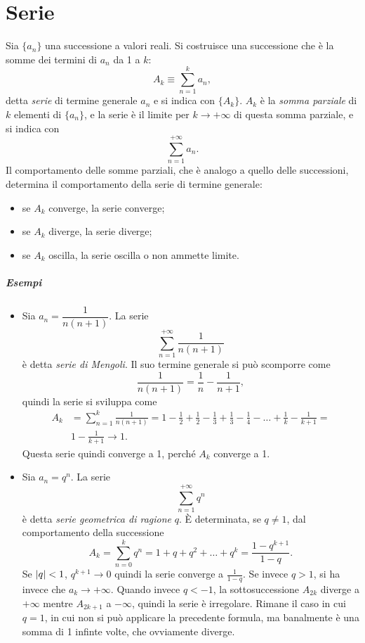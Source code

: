 \chapter{Serie}
Sia $\{a_n\}$ una successione a valori reali. Si costruisce una successione che è la somme dei termini di $a_n$ da 1 a $k$:
\[
A_k\equiv\sum_{n=1}^k a_n,
\]
detta \emph{serie} di termine generale $a_n$ e si indica con $\{A_k\}$. $A_k$ è la \emph{somma parziale} di $k$ elementi di $\{a_n\}$, e la serie è il limite per $k\to+\infty$ di questa somma parziale, e si indica con
\[
\sum_{n=1}^{+\infty}a_n.
\]
Il comportamento delle somme parziali, che è analogo a quello delle successioni, determina il comportamento della serie di termine generale:
\begin{itemize}
\item se $A_k$ converge, la serie converge;
\item se $A_k$ diverge, la serie diverge;
\item se $A_k$ oscilla, la serie oscilla o non ammette limite.
\end{itemize}
\paragraph{Esempi}
\begin{itemize}
\item Sia $a_n=\dfrac1{n(n+1)}$. La serie
\[
\sum_{n=1}^{+\infty}\frac1{n(n+1)}
\]
è detta \emph{serie di Mengoli}. Il suo termine generale si può scomporre come
\[
\frac1{n(n+1)}=\frac1{n}-\frac1{n+1},
\]
quindi la serie si sviluppa come
\[
\begin{split}
A_k&=\sum_{n=1}^k\frac1{n(n+1)}=1-\frac12+\frac12-\frac13+\frac13-\frac14-\dots+\frac1{k}-\frac1{k+1}=\\
&1-\frac1{k+1}\to 1.
\end{split}
\]
Questa serie quindi converge a 1, perché $A_k$ converge a 1.
\item Sia $a_n=q^n$. La serie
\[
\sum_{n=1}^{+\infty}q^n
\]
è detta \emph{serie geometrica di ragione} $q$. È determinata, se $q\neq 1$, dal comportamento della successione
\[
A_k=\sum_{n=0}^kq^n=1+q+q^2+\dots+q^k=\frac{1-q^{k+1}}{1-q}.
\]
Se $\left|{q}\right|<1$, $q^{k+1}\to 0$ quindi la serie converge a $\frac1{1-q}$. Se invece $q>1$, si ha invece che $a_k\to+\infty$.
Quando invece $q<-1$, la sottosuccessione $A_{2k}$ diverge a $+\infty$ mentre $A_{2k+1}$ a $-\infty$, quindi la serie è irregolare.
Rimane il caso in cui $q=1$, in cui non si può applicare la precedente formula, ma banalmente è una somma di 1 infinte volte, che ovviamente diverge.
\end{itemize}

